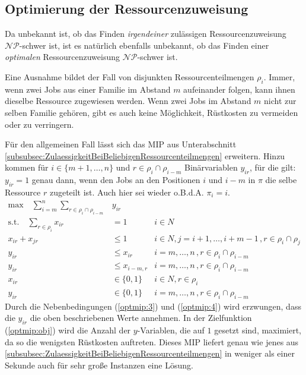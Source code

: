 \documentclass{scrreprt}
\begin{document}
\subsection{Optimierung der Ressourcenzuweisung}
\label{subsec:OptimierungDerRessourcenzuweisung}
Da unbekannt ist, ob das Finden \textit{irgendeiner} zulässigen Ressourcenzuweisung $\mathcal{NP}$-schwer ist,
ist es natürlich ebenfalls unbekannt, ob das Finden einer \textit{optimalen} Ressourcenzuweisung $\mathcal{NP}$-schwer ist.

Eine Ausnahme bildet der Fall von disjunkten Ressourcenteilmengen $\rho_i$.
Immer, wenn zwei Jobs aus einer Familie im Abstand $m$ aufeinander folgen, kann ihnen dieselbe Ressource zugewiesen werden.
Wenn zwei Jobs im Abstand $m$ nicht zur selben Familie gehören, gibt es auch keine Möglichkeit, Rüstkosten zu vermeiden oder zu verringern.

Für den allgemeinen Fall lässt sich das MIP aus Unterabschnitt \ref{subsubsec:ZulaessigkeitBeiBeliebigenRessourcenteilmengen} erweitern.
Hinzu kommen für $i\in \{m+1,\ldots,n\}$ und $r\in\rho_i\cap\rho_{i-m}$ Binärvariablen $y_{ir}$, für die gilt: 
$y_{ir}=1$ genau dann, wenn den Jobs an den Positionen $i$ und $i-m$ in $\pi$ die selbe Ressource $r$ zugeteilt ist.
Auch hier sei wieder o.B.d.A. $\pi_i=i$.
\begin{align}
    \text{max} \quad \sum_{i=m}^n\sum_{r\in\rho_i\cap\rho_{i-m}} &y_{ir} \label{optmip:obj} \\
    \text{s.t.}\quad \sum_{r\in\rho_i} x_{ir} &= 1 & i\in N \label{optmip:1} \\
    x_{ir} + x_{jr} &\leq 1 & i\in N, j=i+1,\ldots,i+m-1 \, ,r\in\rho_i\cap\rho_j \label{optmip:2} \\
    y_{ir} &\leq x_{ir} & i=m,\ldots,n \, ,r\in\rho_i\cap\rho_{i-m} \label{optmip:3}\\
    y_{ir} &\leq x_{i-m,r} & i=m,\ldots,n \, ,r\in\rho_i\cap\rho_{i-m} \label{optmip:4}\\
    x_{ir} &\in \{0,1\} & i\in N, r\in\rho_i \\
    y_{ir} &\in \{0,1\} & i=m,\ldots,n \, ,r\in\rho_i\cap\rho_{i-m}
\end{align}
Durch die Nebenbedingungen (\ref{optmip:3}) und (\ref{optmip:4}) wird erzwungen, dass die $y_{ir}$ die oben beschriebenen Werte annehmen.
In der Zielfunktion (\ref{optmip:obj}) wird die Anzahl der $y$-Variablen, die auf $1$ gesetzt sind, maximiert, da so die wenigsten Rüstkosten auftreten.
Dieses MIP liefert genau wie jenes aus \ref{subsubsec:ZulaessigkeitBeiBeliebigenRessourcenteilmengen} in weniger als einer Sekunde auch für sehr große Instanzen eine Lösung.
\end{document}
